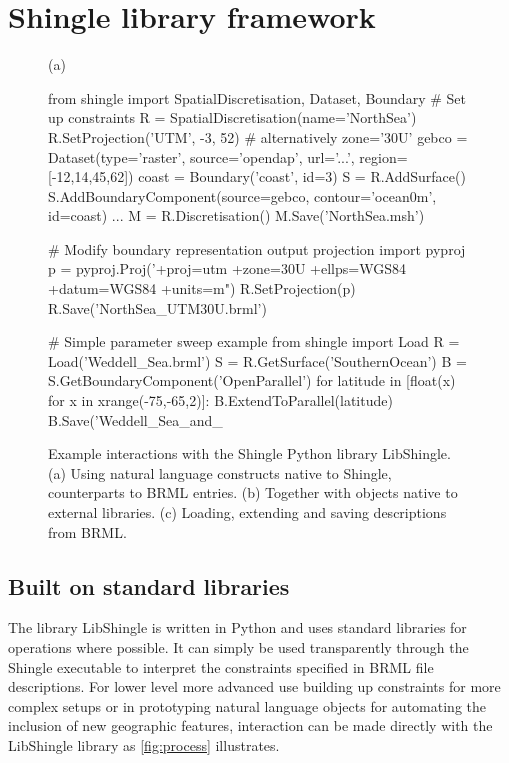 \documentclass[a4paper, 10pt]{book}
\providecommand{\shingle}{Shingle\xspace}
\providecommand{\libshingle}{LibShingle\xspace}
\providecommand{\brml}{BRML\xspace}
\begin{document}
\chapter{\shingle library framework}
\label{sec:framework}
%
%
\begin{figure}[!h]
\footnotesize{(a)}\vspace{-1.6ex}
\begin{pythoncode}
from shingle import SpatialDiscretisation, Dataset, Boundary
# Set up constraints
R = SpatialDiscretisation(name='NorthSea')
R.SetProjection('UTM', -3, 52) # alternatively zone='30U'
gebco = Dataset(type='raster', source='opendap', url='...', region=[-12,14,45,62])
coast = Boundary('coast', id=3)
S = R.AddSurface()
S.AddBoundaryComponent(source=gebco, contour='ocean0m', id=coast)
   ...
M = R.Discretisation()
M.Save('NorthSea.msh')
\end{pythoncode}
%
\begin{pythoncode}
# Modify boundary representation output projection
import pyproj
p = pyproj.Proj('+proj=utm +zone=30U +ellps=WGS84 +datum=WGS84 +units=m")
R.SetProjection(p)
R.Save('NorthSea_UTM30U.brml')
\end{pythoncode}
%
\begin{pythoncode}
# Simple parameter sweep example
from shingle import Load
R = Load('Weddell_Sea.brml')
S = R.GetSurface('SouthernOcean')
B = S.GetBoundaryComponent('OpenParallel')
for latitude in [float(x) for x in xrange(-75,-65,2)]:
  B.ExtendToParallel(latitude)
B.Save('Weddell_Sea_and_%
\end{pythoncode}
\caption{
Example interactions with the Shingle Python library \libshingle.
(a) Using natural language constructs native to Shingle, counterparts to \brml entries.
(b) Together with objects native to external libraries.
(c) Loading, extending and saving descriptions from \brml.
}
\label{fig:python}
\end{figure}
%
\section{Built on standard libraries}
\label{sec:standard}
The library \libshingle is written in Python and uses standard libraries for operations where possible.
%
It can simply be used transparently through the \shingle executable to interpret the constraints specified in \brml file descriptions.
%
For lower level more advanced use building up constraints for more complex setups or
%
in prototyping natural language objects for automating the inclusion of new geographic features,
interaction can be made directly with the \libshingle library as \cref{fig:process} illustrates.
\end{document}
